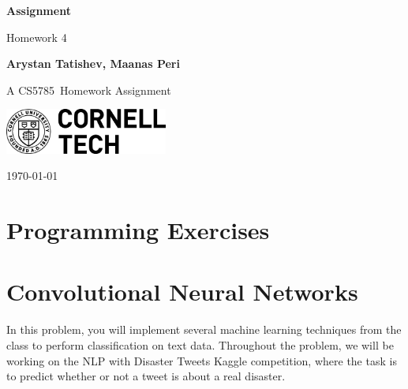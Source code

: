 \documentclass[10pt, a4paper]{article}
\newcommand\course{CS5785}                            %
\newcommand\hwnumber{4}                                 %
\newcommand\Information{Arystan Tatishev, Maanas Peri}                        %
\begin{document}
\begin{titlepage}
    \begin{center}
        \vspace*{3cm}
            
        \Huge
        \textbf{Assignment}
            
        \vspace{1cm}
        \huge
        Homework \hwnumber
            
        \vspace{1.5cm}
        \Large
            
        \textbf{\Information}                      %
        
            
        \vfill
        
        A \course \ Homework Assignment
            
        \vspace{1cm}
            
        \includegraphics[width=0.4\textwidth]{logo-ct.png}
        \\
        
        \Large
        
        \today
            
    \end{center}
\end{titlepage}

\newpage
\section*{Programming Exercises}
\section{Convolutional Neural Networks}
In this problem, you will implement several machine learning techniques from the class to perform classification on text data. Throughout the problem, we will be working on the NLP with Disaster Tweets Kaggle competition, where the task is to predict whether or not a tweet is about a real disaster.
\end{document}

